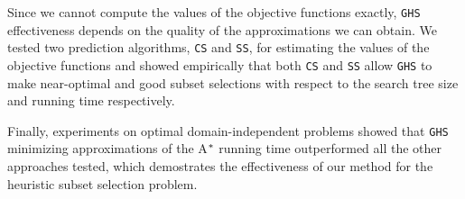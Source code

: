 Since we cannot compute the values of the objective functions exactly, \texttt{GHS} effectiveness depends on the quality of the approximations we can obtain. We tested two prediction algorithms, \texttt{CS} and \texttt{SS}, for estimating the values of the objective functions and showed empirically that both \texttt{CS} and \texttt{SS} allow \texttt{GHS} to make near-optimal and good subset selections with respect to the search tree size and running time respectively.

Finally, experiments on optimal domain-independent problems showed that \texttt{GHS} minimizing approximations of the A$\sp{*}$ running time outperformed all the other approaches tested, which demostrates the effectiveness of our method for the heuristic subset selection problem.

\clearpage